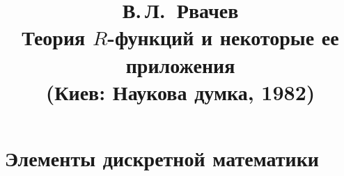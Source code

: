 \documentclass[10pt,openany]{book}
\title{В.\,Л.~Рвачев\\[4pt]
\Large Теория $R$-функций и некоторые ее приложения\\[2pt]
\large (Киев: Наукова думка, 1982)}
\author{}
\date{}
\begin{document}
\maketitle
\thispagestyle{empty}
\tableofcontents




\chapter{Элементы дискретной математики}






\appendix

\end{document}
